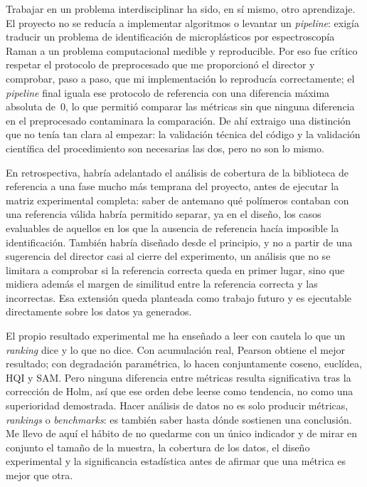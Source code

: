 Trabajar en un problema interdisciplinar ha sido, en sí mismo, otro aprendizaje. El proyecto no se reducía a implementar algoritmos o levantar un \textit{pipeline}: exigía traducir un problema de identificación de microplásticos por espectroscopía Raman a un problema computacional medible y reproducible. Por eso fue crítico respetar el protocolo de preprocesado que me proporcionó el director y comprobar, paso a paso, que mi implementación lo reproducía correctamente; el \textit{pipeline} final iguala ese protocolo de referencia con una diferencia máxima absoluta de~0, lo que permitió comparar las métricas sin que ninguna diferencia en el preprocesado contaminara la comparación. De ahí extraigo una distinción que no tenía tan clara al empezar: la validación técnica del código y la validación científica del procedimiento son necesarias las dos, pero no son lo mismo.

En retrospectiva, habría adelantado el análisis de cobertura de la biblioteca de referencia a una fase mucho más temprana del proyecto, antes de ejecutar la matriz experimental completa: saber de antemano qué polímeros contaban con una referencia válida habría permitido separar, ya en el diseño, los casos evaluables de aquellos en los que la ausencia de referencia hacía imposible la identificación. También habría diseñado desde el principio, y no a partir de una sugerencia del director casi al cierre del experimento, un análisis que no se limitara a comprobar si la referencia correcta queda en primer lugar, sino que midiera además el margen de similitud entre la referencia correcta y las incorrectas. Esa extensión queda planteada como trabajo futuro y es ejecutable directamente sobre los datos ya generados.

El propio resultado experimental me ha enseñado a leer con cautela lo que un \textit{ranking} dice y lo que no dice. Con acumulación real, Pearson obtiene el mejor resultado; con degradación paramétrica, lo hacen conjuntamente coseno, euclídea, HQI y SAM. Pero ninguna diferencia entre métricas resulta significativa tras la corrección de Holm, así que ese orden debe leerse como tendencia, no como una superioridad demostrada. Hacer análisis de datos no es solo producir métricas, \textit{rankings} o \textit{benchmarks}: es también saber hasta dónde sostienen una conclusión. Me llevo de aquí el hábito de no quedarme con un único indicador y de mirar en conjunto el tamaño de la muestra, la cobertura de los datos, el diseño experimental y la significancia estadística antes de afirmar que una métrica es mejor que otra.

